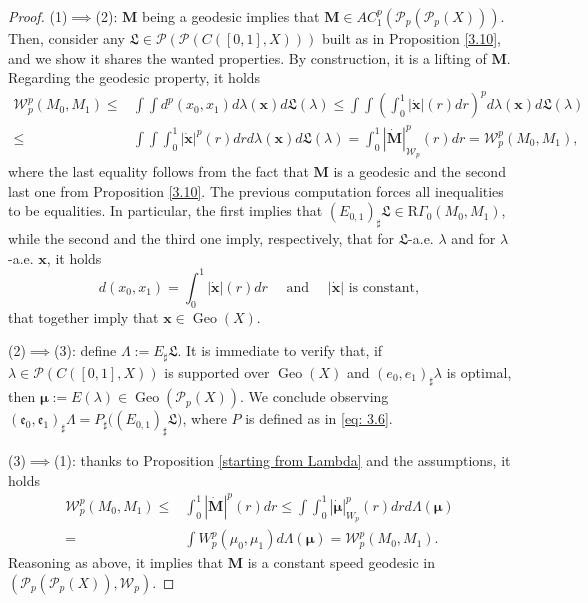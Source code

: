 \documentclass[10pt,leqno]{amsart}
\numberwithin{equation}{section}
\newcommand{\PP}{\mathcal{P}}
\begin{document}
\begin{proof}
    (1)$\implies$(2): $\boldsymbol{M}$ being a geodesic implies that $\boldsymbol{M}\in AC_1^p(\PP_p(\PP_p(X)))$. Then, consider any $\mathfrak{L}\in \PP(\PP(C([0,1],X)))$ built as in Proposition \ref{3.10}, and we show it shares the wanted properties. By construction, it is a lifting of $\boldsymbol{M}$. Regarding the geodesic property, it holds
    \begin{align*}\mathcal{W}_p^p (M_0,M_1) \leq & \int \int d^p(x_0,x_1)d\lambda(\boldsymbol{x}) d\mathfrak{L}(\lambda) \leq \int \int \left( \int_0^1 |\dot{\boldsymbol{x}}|(r)dr\right)^pd\lambda(\boldsymbol{x}) d\mathfrak{L}(\lambda)
    \\ \leq &\int \int \int_0^1 |\dot{\boldsymbol{x}}|^p(r)dr d\lambda(\boldsymbol{x}) d\mathfrak{L}(\lambda) = \int_0^1 |\dot{\boldsymbol{M}}|_{\mathcal{W}_p}^p (r) dr = \mathcal{W}_p^p(M_0,M_1),
    \end{align*}
    where the last equality follows from the fact that $\boldsymbol{M}$ is a geodesic and the second last one from Proposition \ref{3.10}. The previous computation forces all inequalities to be equalities. In particular, the first implies that $(E_{0,1})_\sharp \mathfrak{L}\in \mathrm{R}\Gamma_0(M_0,M_1)$, while the second and the third one imply, respectively, that for $\mathfrak{L}$-a.e. $\lambda$ and for $\lambda$-a.e. $\boldsymbol{x}$, it holds 
    \[d(x_0,x_1) = \int_0^1 |\dot{\boldsymbol{x}}|(r)dr \quad \text{ and } \quad |\dot{\boldsymbol{x}}| \text{ is constant},\]
    that together imply that $\boldsymbol{x}\in \operatorname{Geo}(X)$.

    (2)$\implies$(3): define $\Lambda:= E_\sharp \mathfrak{L}$. It is immediate to verify that, if $\lambda \in \PP(C([0,1],X))$ is supported over $\operatorname{Geo}(X)$ and $(e_0,e_1)_\sharp \lambda$ is optimal, then $\boldsymbol{\mu}:= E(\lambda)\in \operatorname{Geo}(\PP_p(X))$. We conclude observing $(\mathfrak{e}_0, \mathfrak{e}_1)_\sharp \Lambda = P_\sharp \big((E_{0,1})_\sharp \mathfrak{L}\big)$, where $P$ is defined as in \eqref{eq: 3.6}.

    (3)$\implies$(1): thanks to Proposition \ref{starting from Lambda} and the assumptions, it holds
    \begin{align*}
    \mathcal{W}_p^p(M_0,M_1)\leq & \int_0^1|\dot{\boldsymbol{M}}|^p(r)dr \leq \int \int_0^1 |\dot{\boldsymbol{\mu}}|_{W_p}^p(r)dr d\Lambda(\boldsymbol{\mu}) 
    \\
    = & \int W_p^p(\mu_0,\mu_1)d\Lambda(\boldsymbol{\mu}) = \mathcal{W}_p^p(M_0,M_1).
    \end{align*}
    Reasoning as above, it implies that $\boldsymbol{M}$ is a constant speed geodesic in $(\PP_p(\PP_p(X)), \mathcal{W}_p)$.
\end{proof}
\end{document}
